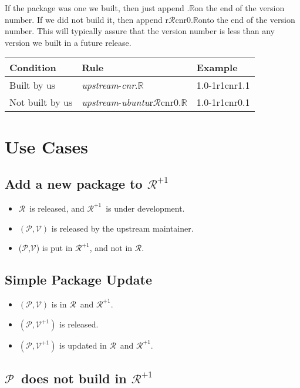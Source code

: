 \documentclass[11pt]{article}
\newcommand{\release}{\ensuremath{\mathcal{R}}}
\newcommand{\nextrelease}{\ensuremath{\mathcal{R}^{+1}}}
\newcommand{\version}{\ensuremath{\mathcal{V}}}
\newcommand{\nextversion}{\ensuremath{\mathcal{V}^{+1}}}
\newcommand{\package}{\ensuremath{\mathcal{P}}}
\newcommand{\revision}{\ensuremath{\mathbb{R}}}
\begin{document}
If the package was one we built, then just append .\revision on the
end of the version number. If we did not build it, then append
r{\release}cnr0.\revision onto the end of the version number. This
will typically assure that the version number is less than any version
we built in a future release. 

\noindent
\begin{tabular}{|l|l||l|}
\hline
Condition & Rule & Example \\
\hline
\hline
Built by us & \textit{upstream}-\textit{cnr}.\revision & 1.0-1r1cnr1.1 \\
\hline
Not built by us & \textit{upstream}-\textit{ubuntu}r{\release}cnr0.\revision & 1.0-1r1cnr0.1 \\
\hline
\end{tabular}





\section{Use Cases}
\subsection{Add a new package to \nextrelease}

\begin{itemize}
\item \release\ is released, and \nextrelease\ is under development.
\item $(\package, \version)$ is released by the upstream maintainer.
\item (\package,\version) is put in \nextrelease, and not in \release.
\end{itemize}

\subsection{Simple Package Update}

\begin{itemize}
\item $(\package, \version)$ is in \release\ and \nextrelease.
\item $(\package, \nextversion)$ is released.
\item $(\package, \nextversion)$ is updated in \release\ and \nextrelease.
\end{itemize}


\subsection{\package\ does not build in \nextrelease}
\end{document}
